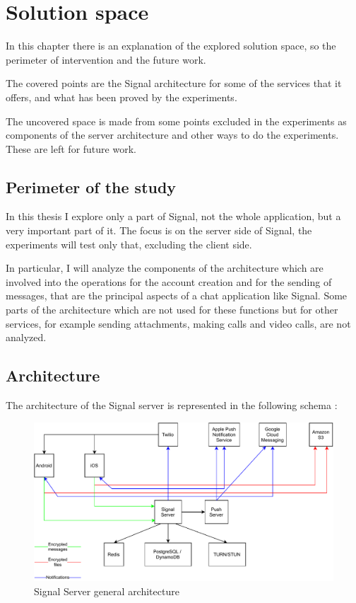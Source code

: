 \chapter{Solution space\label{sec:solutionspace}}

In this chapter there is an explanation of the explored solution space, so the perimeter of intervention and the future work.

The covered points are the Signal architecture for some of the services that it offers, and what has been proved by the experiments.

The uncovered space is made from some points excluded in the experiments as components of the server architecture and other ways to do the experiments.
These are left for future work.

\section{Perimeter of the study\label{sec:covered}}

In this thesis I explore only a part of Signal, not the whole application, but a very important part of it.
The focus is on the server side of Signal, the experiments will test only that, excluding the client side.

In particular, I will analyze the components of the architecture which are involved into the operations for the account creation and for the sending of messages, that are the principal aspects of a chat application like Signal.
Some parts of the architecture which are not used for these functions but for other services, for example sending attachments, making calls and video calls, are not analyzed.

\clearpage

\section{Architecture\label{sec:architecture}}

The architecture of the Signal server is represented in the following schema \parencite{cocorada_2018}:

\begin{figure}[H]
    \centering
    \includegraphics[width=\textwidth]{images/Architecture}
    \caption{Signal Server general architecture}
    \label{fig:signalarchitecture}
\end{figure}

